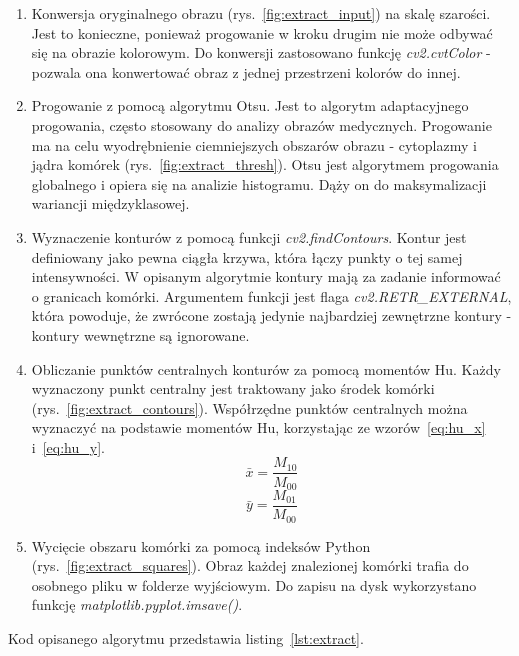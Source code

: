 \begin{enumerate}
    \item Konwersja oryginalnego obrazu (rys.~\ref{fig:extract_input}) na skalę szarości.
    Jest to konieczne, ponieważ progowanie w kroku drugim nie może odbywać się na obrazie kolorowym.
    Do konwersji zastosowano funkcję \textit{cv2.cvtColor} - pozwala ona konwertować obraz z jednej przestrzeni kolorów do innej.
    \item Progowanie z pomocą algorytmu Otsu.
    Jest to algorytm adaptacyjnego progowania, często stosowany do analizy obrazów medycznych.
    Progowanie ma na celu wyodrębnienie ciemniejszych obszarów obrazu - cytoplazmy i jądra komórek (rys.~\ref{fig:extract_thresh}). Otsu jest algorytmem progowania globalnego i opiera się na analizie histogramu.
    Dąży on do maksymalizacji wariancji międzyklasowej.
    \item Wyznaczenie konturów z pomocą funkcji \textit{cv2.findContours}.
    Kontur jest definiowany jako pewna ciągła krzywa, która łączy punkty o tej samej intensywności.
    W opisanym algorytmie kontury mają za zadanie informować o granicach komórki.
    Argumentem funkcji jest flaga \textit{cv2.RETR\_EXTERNAL}, która powoduje, że zwrócone zostają jedynie najbardziej zewnętrzne kontury - kontury wewnętrzne są ignorowane.
    \item Obliczanie punktów centralnych konturów za pomocą momentów Hu. Każdy wyznaczony punkt centralny jest traktowany jako środek komórki (rys.~\ref{fig:extract_contours}).
    Współrzędne punktów centralnych można wyznaczyć na podstawie momentów Hu, korzystając ze wzorów~\ref{eq:hu_x} i~\ref{eq:hu_y}.
    \begin{equation}
        \bar{x} = \dfrac{M_{10}}{M_{00}}\label{eq:hu_x}
    \end{equation}
    \begin{equation}
        \bar{y} = \dfrac{M_{01}}{M_{00}}\label{eq:hu_y}
    \end{equation}
    \item Wycięcie obszaru komórki za pomocą indeksów Python (rys.~\ref{fig:extract_squares}). Obraz każdej znalezionej komórki trafia do osobnego pliku w folderze wyjściowym.
    Do zapisu na dysk wykorzystano funkcję \textit{matplotlib.pyplot.imsave()}.
\end{enumerate}

Kod opisanego algorytmu przedstawia listing~\ref{lst:extract}.

